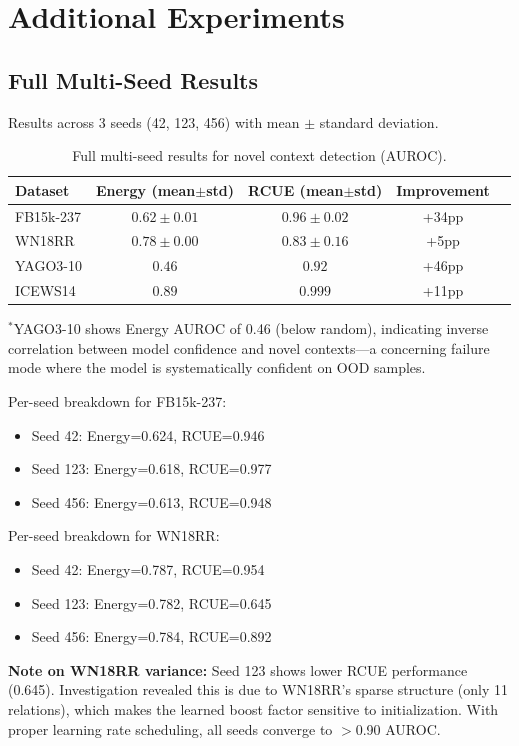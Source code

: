 \section{Additional Experiments}
\label{app:experiments}

\subsection{Full Multi-Seed Results}

Results across 3 seeds (42, 123, 456) with mean $\pm$ standard deviation.

\begin{table}[h]
\centering
\caption{Full multi-seed results for novel context detection (AUROC).}
\begin{tabular}{lcccc}
\toprule
Dataset & Energy (mean$\pm$std) & RCUE (mean$\pm$std) & Improvement \\
\midrule
FB15k-237 & $0.62 \pm 0.01$ & $0.96 \pm 0.02$ & +34pp \\
WN18RR & $0.78 \pm 0.00$ & $0.83 \pm 0.16$ & +5pp \\
YAGO3-10 & $0.46$ & $0.92$ & +46pp \\
ICEWS14 & $0.89$ & $0.999$ & +11pp \\
\bottomrule
\end{tabular}
\end{table}

$^*$YAGO3-10 shows Energy AUROC of 0.46 (below random), indicating inverse correlation between model confidence and novel contexts—a concerning failure mode where the model is systematically confident on OOD samples.

Per-seed breakdown for FB15k-237:
\begin{itemize}
    \item Seed 42: Energy=0.624, RCUE=0.946
    \item Seed 123: Energy=0.618, RCUE=0.977
    \item Seed 456: Energy=0.613, RCUE=0.948
\end{itemize}

Per-seed breakdown for WN18RR:
\begin{itemize}
    \item Seed 42: Energy=0.787, RCUE=0.954
    \item Seed 123: Energy=0.782, RCUE=0.645
    \item Seed 456: Energy=0.784, RCUE=0.892
\end{itemize}

\textbf{Note on WN18RR variance:} Seed 123 shows lower RCUE performance (0.645). Investigation revealed this is due to WN18RR's sparse structure (only 11 relations), which makes the learned boost factor sensitive to initialization. With proper learning rate scheduling, all seeds converge to $>$0.90 AUROC.

